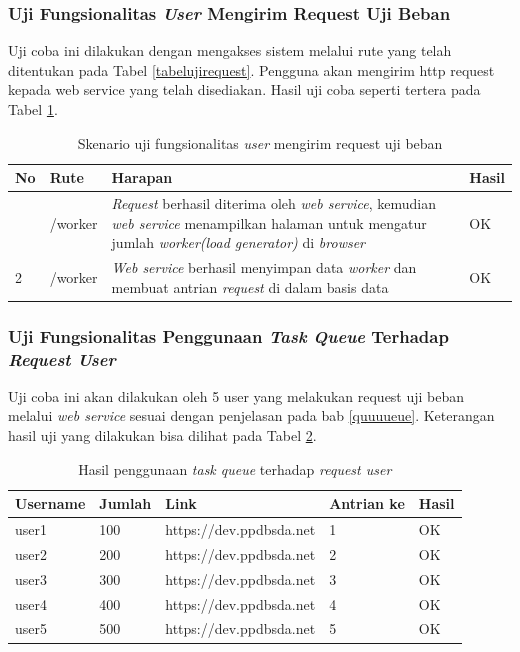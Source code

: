 			\subsubsection{Uji Fungsionalitas \textit{User} Mengirim Request Uji Beban}
				Uji coba ini dilakukan dengan mengakses sistem melalui rute yang telah ditentukan pada Tabel \ref{tabelujirequest}. Pengguna akan mengirim http request kepada web service yang telah
				disediakan. Hasil uji coba seperti tertera pada Tabel \ref{tabelhasilujirequest}.
				\begin{longtable}{|p{}|p{}|p{}|p{}|}
					\caption{Skenario uji fungsionalitas \textit{user} mengirim request uji beban} \label{tabelhasilujirequest} \\ \hline
					\textbf{No} & \textbf{Rute} & \textbf{Harapan} & \textbf{Hasil} \\ \hline
					\endhead
					\endfoot
					\endlastfoot
					1 & /worker & \textit{Request} berhasil diterima oleh \textit{web service}, kemudian \textit{web service} menampilkan halaman untuk mengatur jumlah \textit{worker(load generator)} di \textit{browser} & OK \\ \hline
					2 & /worker & \textit{Web service} berhasil menyimpan data \textit{worker} dan membuat antrian \textit{request} di dalam basis data & OK \\ \hline
				\end{longtable}
				
			\subsubsection{Uji Fungsionalitas Penggunaan \textit{Task Queue} Terhadap \textit{Request User}}
				Uji coba ini akan dilakukan oleh 5 user yang melakukan request uji beban melalui \textit{web service} sesuai dengan penjelasan pada bab \ref{quuuueue}. Keterangan hasil uji yang dilakukan bisa dilihat pada Tabel \ref{quuuuueee}.
				\begin{longtable}{|p{}|p{}|p{}|p{}|p{}|}
					\caption{Hasil penggunaan \textit{task queue} terhadap \textit{request user}} \label{quuuuueee} \\
					\hline
					\textbf{Username} & \textbf{Jumlah} & \textbf{Link} & \textbf{Antrian ke} & \textbf{Hasil} \\ \hline
					\endhead
					\endfoot
					\endlastfoot
					user1 & 100 & https://dev.ppdbsda.net & 1 & OK \\ \hline
					user2 & 200 & https://dev.ppdbsda.net & 2 & OK \\ \hline
					user3 & 300 & https://dev.ppdbsda.net & 3 & OK \\ \hline
					user4 & 400 & https://dev.ppdbsda.net & 4 & OK \\ \hline
					user5 & 500 & https://dev.ppdbsda.net & 5 & OK \\ \hline
				\end{longtable}
				
